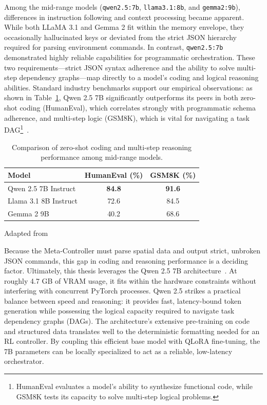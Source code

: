 Among the mid-range models (\texttt{qwen2.5:7b}, \texttt{llama3.1:8b}, and \texttt{gemma2:9b}), differences in instruction following and context processing became apparent. While both LLaMA 3.1 and Gemma 2 fit within the memory envelope, they occasionally hallucinated keys or deviated from the strict JSON hierarchy required for parsing environment commands. In contrast, \texttt{qwen2.5:7b} demonstrated highly reliable capabilities for programmatic orchestration. These two requirements---strict JSON syntax adherence and the ability to solve multi-step dependency graphs---map directly to a model's coding and logical reasoning abilities. Standard industry benchmarks support our empirical observations: as shown in Table~\ref{tab:model_benchmarks}, Qwen 2.5 7B significantly outperforms its peers in both zero-shot coding (HumanEval), which correlates strongly with programmatic schema adherence, and multi-step logic (GSM8K), which is vital for navigating a task DAG\footnote{HumanEval evaluates a model's ability to synthesize functional code, while GSM8K tests its capacity to solve multi-step logical problems.}~\parencite{Qwen_Yang_Yang_Zhang_Hui_Zheng_Yu_Li_Liu_Huang_et_al_2024}. 

\begin{table}[H]
\centering
\begin{tabular}{lcc}
\toprule
\textbf{Model} & \textbf{HumanEval (\%)} & \textbf{GSM8K (\%)} \\
\midrule
Qwen 2.5 7B Instruct & \textbf{84.8} & \textbf{91.6} \\
Llama 3.1 8B Instruct & 72.6 & 84.5 \\
Gemma 2 9B & 40.2 & 68.6 \\
\bottomrule
\end{tabular}
\caption[Comparison of Mid-Range LLMs]{Comparison of zero-shot coding and multi-step reasoning performance among mid-range models.}
\label{tab:model_benchmarks}
\vspace{3mm}
{\raggedleft \footnotesize Adapted from \parencite{Qwen_Yang_Yang_Zhang_Hui_Zheng_Yu_Li_Liu_Huang_et_al_2024} \par}
\end{table} 

Because the Meta-Controller must parse spatial data and output strict, unbroken JSON commands, this gap in coding and reasoning performance is a deciding factor. Ultimately, this thesis leverages the Qwen 2.5 7B architecture~\parencite{Qwen_Yang_Yang_Zhang_Hui_Zheng_Yu_Li_Liu_Huang_et_al_2024}. At roughly 4.7 GB of VRAM usage, it fits within the hardware constraints without interfering with concurrent PyTorch processes. Qwen 2.5 strikes a practical balance between speed and reasoning: it provides fast, latency-bound token generation while possessing the logical capacity required to navigate task dependency graphs (DAGs). The architecture's extensive pre-training on code and structured data translates well to the deterministic formatting needed for an RL controller. By coupling this efficient base model with QLoRA fine-tuning, the 7B parameters can be locally specialized to act as a reliable, low-latency orchestrator.

